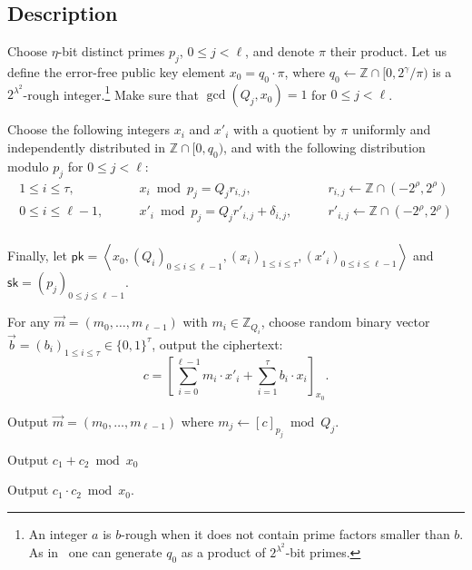 \documentclass[11pt]{llncs}
\renewcommand\leq\leqslant
\newcommand{\Z}{{\mathbb Z}}
\DeclareMathOperator{\KeyGen}{\ensuremath{\mathsf{KeyGen}}}
\DeclareMathOperator{\Encrypt}{\ensuremath{\mathsf{Encrypt}}}
\DeclareMathOperator{\Decrypt}{\ensuremath{\mathsf{Decrypt}}}
\DeclareMathOperator{\Add}{\ensuremath{\mathsf{Add}}}
\DeclareMathOperator{\Mult}{\ensuremath{\mathsf{Mult}}}
\newcommand*{\pk}{\ensuremath{\mathsf{pk}}}
\newcommand*{\sk}{\ensuremath{\mathsf{sk}}}
\newcommand*{\CDGHV}{\ensuremath{\mathsf{CDGHV}}}
\begin{document}
\subsection{Description}
\begin{description}\label{CDGHV}
\item[$\CDGHV.\KeyGen(1^\lambda,(Q_j)_{0\leq j <\ell})$.] Choose $\eta$-bit distinct primes $p_j$, $0\leq j<\ell$, and denote $\pi$
their product. Let us define the error-free public key element
$x_0=q_0\cdot\pi$, where $q_0 \gets \Z \cap [0,2^{\gamma}/\pi)$
  is a $2^{\lambda^2}$-rough integer.\footnote{An integer $a$ is $b$-rough when it does
    not contain prime factors smaller than $b$. As in~\cite{CMNT2011} one can
    generate $q_0$ as a product of $2^{\lambda^2}$-bit primes.}  
  Make sure that $\gcd(Q_j,x_0)=1$ for $0\leq j<\ell$. 
  
  Choose the following integers $x_i$ and $x'_i$ with a quotient by $\pi$ uniformly
  and independently distributed in $\Z\cap [0, q_0)$, and with the
    following distribution modulo $p_j$ for $0 \leq j < \ell$:
$$
\begin{array}{lll}
1 \leq i \leq \tau, & \qquad x_i\bmod p_j = Q_j r_{i,j},& \qquad r_{i,j}
\gets\Z\cap(-2^{\rho}, 2^{\rho}) \\[.2cm]

0\leq i\leq \ell-1, & \qquad x'_i\bmod p_j = Q_jr'_{i,j}+\delta_{i,j}, &
\qquad r'_{i,j}\gets\Z\cap(-2^{\rho}, 2^{\rho}) \\[.2cm]

\end{array}
$$

Finally, let $\pk = \left\langle x_0, \left(Q_i\right)_{0\leq i \leq \ell-1},\left(x_i\right)_{1\leq i\leq \tau}, \left(x'_i\right)_{0\leq i\leq \ell-1}\right\rangle$ and $\sk=(p_j)_{0\leq j\leq {\ell-1}}$.
\\\vspace{-0.25cm}
\item[$\CDGHV.\Encrypt(\pk, {\vec{m}})$.] For any $\vec{m}=(m_0,\dots,m_{\ell-1})$ with $m_i\in\Z_{Q_i}$, choose random binary vector $\vec{b}=(b_i)_{1\leq i \leq \tau}\in \{0,1\}^\tau$, output the ciphertext:
\begin{equation}
\label{eq:enccdghv}
c = \left[\sum\limits_{i=0}^{\ell-1} m_i \cdot x'_i + 
	\sum_{i=1}^\tau 
b_i\cdot x_i\right]_{x_0}.
\end{equation}
\item[$\CDGHV.\Decrypt(\sk, c)$.] Output $\vec{m}=(m_0,\ldots,m_{\ell-1})$ where $m_j \gets [c]_{p_j} \bmod Q_j$.
\\\vspace{-0.25cm}
\item[$\CDGHV.\Add(\pk, c_1, c_2)$.] Output $c_1+c_2 \bmod x_0$
\\\vspace{-0.25cm}
\item[$\CDGHV.\Mult(\pk, c_1, c_2)$.] Output $c_1 \cdot c_2 \bmod x_0$.
\end{description}
\end{document}
